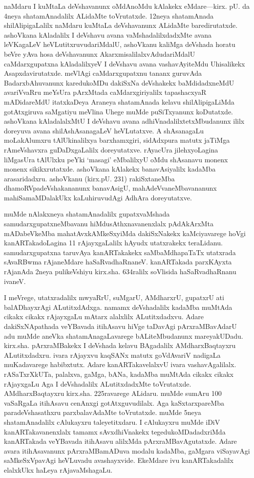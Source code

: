 \documentclass[11pt,a4size]{article}
\begin{document}
naMdaru I kuMtaLa deVshavanunx oMdAnoMdu kAlakekx
eMdare---kirx. pU. da 4neya shatamAnadalilx ALidaMte
toVrutatxde. 12neya shatamAnada shilAlipigaLalilx naMdaru kuMtaLa
deVshavanunx ALidaMte baredirutatxde. ashoVkana kAladalilx I deVshavu
avana vaMshadalilxdadxMte avana leVKagaLeV heVLutitxruvudariMdalU,
ashoVkanu kaliMga deVshada horatu beVre yAva hosa deVshavanunx
AkarxmisalilalxvAdudariMdalU caMdarxgupatxna kAladalilxyeV I deVshavu
avana vashavAyiteMdu Uhisalikekx Asapxdavirutatxde. meVlAgi
caMdarxgupatxnu tananx guruvAda BadarxbAhuvanunx karedukoMDu dakiSxNa
deVshakekx baMdidadxneMdU avariVvaRru meYsUra pArxMtada
caMdarxgiriyalilx tapashacxyaR mADidareMdU itatxkaDeya Araneya
shatamAnada kelavu shilAlipigaLiMda gotAtxgiruva saMgatiyu meVlina
Uhege muMde puSiTxyanunx koDutatxde. ashoVkana kAladalalxMtU I
deVshavu avana adhiVnadalilxtetxMbudanunx ililx doreyuva avana
shilAshAsanagaLeV heVLutatxve. A shAsanagaLu moLakAlumxru
tAlUkinalilxya barxhamxgiri, sidAdxpura matutx jaTiMga rAmeVshavxra
guDaDxgaLalilx doreyutatxve. rAyacUra jilehxyoLagina liMgasUra
tAlUlxku peYki `masagi' eMbalilxyU oMdu shAsanavu monenx monenx
sikikxrutatxde. ashoVkana kAlakekx banavAsiyalilx kadaMba
arasaridadxru. ashoVkanu (kirx.pU. 231) rakiSxtaneMba
dhamoRVpadeVshakananunx banavAsigU, mahAdeVvaneMbavananunx
mahiSamaMDalakUkx kaLuhiruvudAgi AdhAra doreyutatxve.

muMde nAlakxneya shatamAnadalilx gupatxvaMshada
samudarxgupatxneMbavanu hiMdusAthxnavanenxlalx pAdAkArxMta
mADabeVkeMba mahatAvxkAMkeSxyiMda dakiSxNakekx kaMciyavarege hoVgi
kanARTakadoLagina 11 rAjayxgaLalilx hAyudx utatxrakekx
teraLidanu. samudarxgupatxna taruvAya kanARTakakekx saMbaMdhapaTaTx
utatxrada sAvaRBwma rAjaneMdare haSaRvadhaRnaneV. kanARTakada
parxKAyxta rAjanAda 2neya pulikeVshiyu kirx.sha. 634ralilx soVlisida
haSaRvadhaRnanu ivaneV.

I meVrege, utatxradalilx mwyaRrU, suMgarU, AMdharxrU, gupatxrU ati
balADhayxrAgi ALutitxdAdxga. namamx deVshadalilx kadaMba muMtAda
cikakx cikakx rAjayxgaLu mAtarx alalxlilx ALutitxdadxvu. Adare
dakiSxNApathada veYBavada itihAsavu hiVge taDavAgi pArxraMBavAdarU adu
muMde aneVka shatamAnagaLavarege bALiteMbudanunx
mareyakUDadu. kirx.sha. pArxraMBakekx I deVshada kelavu BAgadalilx
AMdharxBaqtayxru ALutitxdadxru. ivara rAjayxvu kaqSANx matutx
goVdAvariV nadigaLa muKadavarege habibxtutx. Adare kanARTakavelalxvU
ivara vashavAgalilalx. rASaTxrXkUTa, palalxva, gaMga, bANa, kadaMba
muMtAda cikakx cikakx rAjayxgaLu Aga I deVshadalilx ALutitxdadxMte
toVrutatxde. AMdharxBaqtayxru kirx.sha. 225ravarege ALidaru. muMde
sumAru 100 vaSaRgaLa itihAsavu cenAnxgi gotAtxguvudilalx. Aga
kaSxtarxpareMba paradeVshasathxru parxbalavAdaMte toVrutatxde. muMde
5neya shatamAnadalilx cAlukayxru taleyetitxdaru. I cAlukayxru muMde
iDiV kanARTakavanenxlalx tamamx sAvxdhiVnakekx tegedukoMDadadxriMda
kanARTakada veYBavada itihAsavu alilxMda pArxraMBavAgutatxde. Adare
avara itihAsavanunx pArxraMBamADuva modalu kadaMba, gaMgara viSayavAgi
saMkeSxVpavAgi heVLuvadu avashayxvide. EkeMdare ivu kanARTakadalilx
elalxkUkx haLeya rAjavaMshagaLu.
\end{document}
